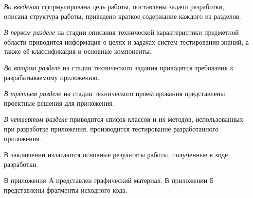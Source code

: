 \emph{Во введении} сформулирована цель работы, поставлены задачи разработки, описана структура работы, приведено краткое содержание каждого из разделов.

\emph{В первом разделе} на стадии описания технической характеристики предметной области приводится информация о целях и задачах систем тестирования знаний, а также её классификация и основные компоненты.

\emph{Во втором разделе} на стадии технического задания приводятся требования к разрабатываемому приложению.

\emph{В третьем разделе} на стадии технического проектирования представлены проектные решения для приложения.

\emph{В четвертом разделе} приводится список классов и их методов, использованных при разработке приложения, производится тестирование разработанного приложения.

В заключении излагаются основные результаты работы, полученные в ходе разработки.

В приложении А представлен графический материал.
В приложении Б представлены фрагменты исходного кода. 
